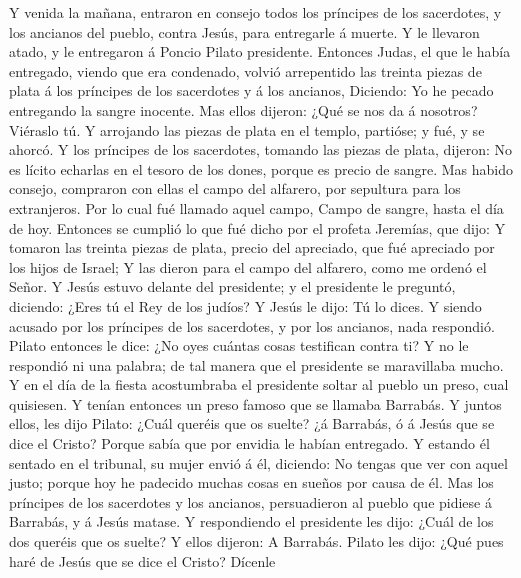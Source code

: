 Y venida la mañana, entraron en consejo todos los
príncipes de los sacerdotes, y los ancianos del pueblo, contra Jesús,
para entregarle á muerte.  Y le llevaron atado, y le
entregaron á Poncio Pilato presidente.  Entonces Judas, el
que le había entregado, viendo que era condenado, volvió arrepentido las
treinta piezas de plata á los príncipes de los sacerdotes y á los
ancianos,  Diciendo: Yo he pecado entregando la sangre
inocente. Mas ellos dijeron: ¿Qué se nos da á nosotros? Viéraslo tú.
 Y arrojando las piezas de plata en el templo, partióse; y
fué, y se ahorcó.  Y los príncipes de los sacerdotes,
tomando las piezas de plata, dijeron: No es lícito echarlas en el tesoro
de los dones, porque es precio de sangre.  Mas habido
consejo, compraron con ellas el campo del alfarero, por sepultura para
los extranjeros.  Por lo cual fué llamado aquel campo,
Campo de sangre, hasta el día de hoy.  Entonces se cumplió
lo que fué dicho por el profeta Jeremías, que dijo: Y tomaron las
treinta piezas de plata, precio del apreciado, que fué apreciado por los
hijos de Israel;  Y las dieron para el campo del
alfarero, como me ordenó el Señor.  Y Jesús estuvo
delante del presidente; y el presidente le preguntó, diciendo: ¿Eres tú
el Rey de los judíos? Y Jesús le dijo: Tú lo dices.  Y
siendo acusado por los príncipes de los sacerdotes, y por los ancianos,
nada respondió.  Pilato entonces le dice: ¿No oyes
cuántas cosas testifican contra ti?  Y no le respondió ni
una palabra; de tal manera que el presidente se maravillaba mucho.
 Y en el día de la fiesta acostumbraba el presidente
soltar al pueblo un preso, cual quisiesen.  Y tenían
entonces un preso famoso que se llamaba Barrabás.  Y
juntos ellos, les dijo Pilato: ¿Cuál queréis que os suelte? ¿á Barrabás,
ó á Jesús que se dice el Cristo?  Porque sabía que por
envidia le habían entregado.  Y estando él sentado en el
tribunal, su mujer envió á él, diciendo: No tengas que ver con aquel
justo; porque hoy he padecido muchas cosas en sueños por causa de él.
 Mas los príncipes de los sacerdotes y los ancianos,
persuadieron al pueblo que pidiese á Barrabás, y á Jesús matase.
 Y respondiendo el presidente les dijo: ¿Cuál de los dos
queréis que os suelte? Y ellos dijeron: A Barrabás. 
Pilato les dijo: ¿Qué pues haré de Jesús que se dice el Cristo? Dícenle
